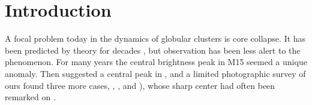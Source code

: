 \documentclass[manuscript]{aastex}
\begin{document}





\section{Introduction}

A focal problem today in the dynamics of globular clusters is core collapse.  
It has been predicted by theory for decades \citep{hen61,lyn68,spi85}, but
observation has been less alert to the phenomenon. For many years the
central brightness peak in M15 \citep{kin75,new78} seemed a unique anomaly.  
Then \citet{aur82} suggested a central peak in , and a 
limited photographic survey of ours \citep[Paper I]{djo84} found three more 
cases, , , and 
), whose sharp center had often been 
remarked on \citep{can78}.  
\end{document}
